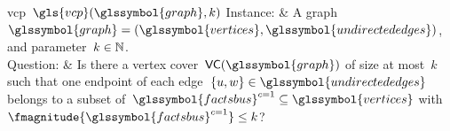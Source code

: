 \begin{problem}[framed]{\acrlong{vcp}~$\gls{vcp}(\glssymbol{graph},k)$}%
    Instance: & A graph~$\glssymbol{graph} = (\glssymbol{vertices},
    \glssymbol{undirectededges})$, and parameter~$k\in\mathbb{N}$.\\
    Question: & Is there a vertex cover~$\vc(\glssymbol{graph})$ of size at
    most~$k$ such that one endpoint of each edge~$
    \{\vertexa,\vertexc\}
    \in
    \glssymbol{undirectededges}
    $ belongs to a subset of~$
    \glssymbol{factsbus}^{c = 1} 
    \subseteq 
    \glssymbol{vertices}
    $ with~$
    \fmagnitude{\glssymbol{factsbus}^{c = 1}} 
    \leq 
    k
    $?
\end{problem}%